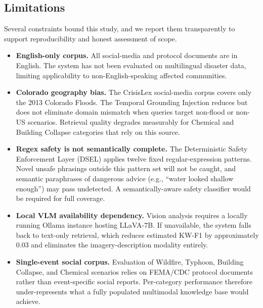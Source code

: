 \documentclass[conference]{IEEEtran}
\begin{document}
\subsection{Limitations}

Several constraints bound this study, and we report them transparently
to support reproducibility and honest assessment of scope.

\begin{itemize}
  \item \textbf{English-only corpus.} All social-media and protocol
        documents are in English. The system has not been evaluated
        on multilingual disaster data, limiting applicability to
        non-English-speaking affected communities.

  \item \textbf{Colorado geography bias.} The CrisisLex social-media
        corpus covers only the 2013 Colorado Floods. The Temporal
        Grounding Injection reduces but does not eliminate domain
        mismatch when queries target non-flood or non-US scenarios.
        Retrieval quality degrades measurably for Chemical and
        Building Collapse categories that rely on this source.

  \item \textbf{Regex safety is not semantically complete.} The
        Deterministic Safety Enforcement Layer (DSEL) applies twelve
        fixed regular-expression patterns. Novel unsafe phrasings
        outside this pattern set will not be caught, and semantic
        paraphrases of dangerous advice (e.g., ``water looked
        shallow enough'') may pass undetected. A semantically-aware
        safety classifier would be required for full coverage.

  \item \textbf{Local VLM availability dependency.} Vision analysis
        requires a locally running Ollama instance hosting LLaVA-7B.
        If unavailable, the system falls back to text-only retrieval,
        which reduces estimated KW-F1 by approximately 0.03 and
        eliminates the imagery-description modality entirely.

  \item \textbf{Single-event social corpus.} Evaluation of Wildfire,
        Typhoon, Building Collapse, and Chemical scenarios relies on
        FEMA/CDC protocol documents rather than event-specific social
        reports. Per-category performance therefore under-represents
        what a fully populated multimodal knowledge base would achieve.


\end{itemize}
\end{document}
